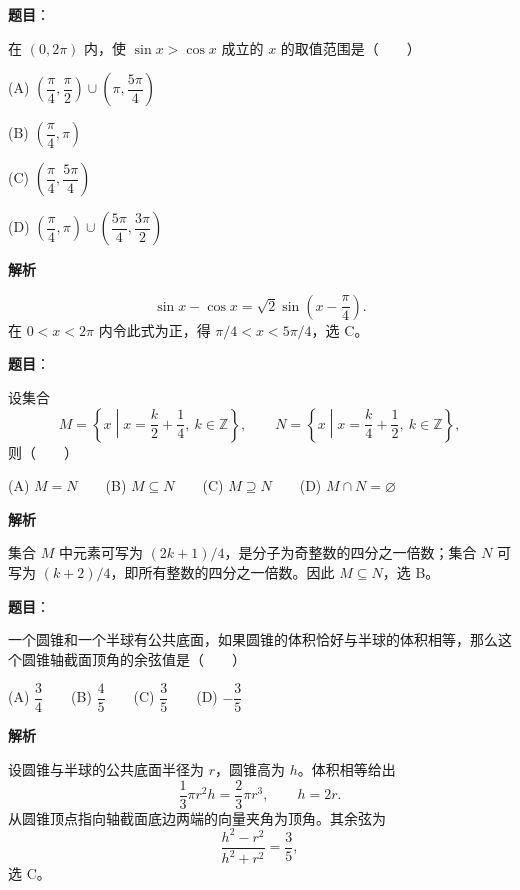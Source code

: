 \begin{answer}

\textbf{题目}：

在 $(0,2\pi)$ 内，使 $\sin x>\cos x$ 成立的 $x$ 的取值范围是\mbox{（　　）}

(A) $\left(\dfrac\pi4,\dfrac\pi2\right)\cup\left(\pi,\dfrac{5\pi}4\right)$

(B) $\left(\dfrac\pi4,\pi\right)$

(C) $\left(\dfrac\pi4,\dfrac{5\pi}4\right)$

(D) $\left(\dfrac\pi4,\pi\right)\cup\left(\dfrac{5\pi}4,\dfrac{3\pi}2\right)$

\textbf{解析}

\nopagebreak[4]
\[
\sin x-\cos x=\sqrt2\sin\left(x-\frac\pi4\right).
\]
在 $0<x<2\pi$ 内令此式为正，得 $\pi/4<x<5\pi/4$，选 C。


\end{answer}
\begin{answer}

\textbf{题目}：

设集合
\nopagebreak[4]
\[
M=\left\{x\middle|x=\frac{k}{2}+\frac14,\ k\in\mathbb Z\right\},\qquad
N=\left\{x\middle|x=\frac{k}{4}+\frac12,\ k\in\mathbb Z\right\},
\]
则\mbox{（　　）}

(A) $M=N$　　(B) $M\subseteq N$　　(C) $M\supseteq N$　　(D) $M\cap N=\varnothing$

\textbf{解析}

集合 $M$ 中元素可写为 $(2k+1)/4$，是分子为奇整数的四分之一倍数；集合 $N$ 可写为 $(k+2)/4$，即所有整数的四分之一倍数。因此 $M\subseteq N$，选 B。


\end{answer}
\begin{answer}

\textbf{题目}：

一个圆锥和一个半球有公共底面，如果圆锥的体积恰好与半球的体积相等，那么这个圆锥轴截面顶角的余弦值是\mbox{（　　）}

(A) $\dfrac34$　　(B) $\dfrac45$　　(C) $\dfrac35$　　(D) $-\dfrac35$

\textbf{解析}

设圆锥与半球的公共底面半径为 $r$，圆锥高为 $h$。体积相等给出
\nopagebreak[4]
\[
\frac13\pi r^2h=\frac23\pi r^3,\qquad h=2r.
\]
从圆锥顶点指向轴截面底边两端的向量夹角为顶角。其余弦为
\nopagebreak[4]
\[
\frac{h^2-r^2}{h^2+r^2}=\frac35,
\]
选 C。


\end{answer}
